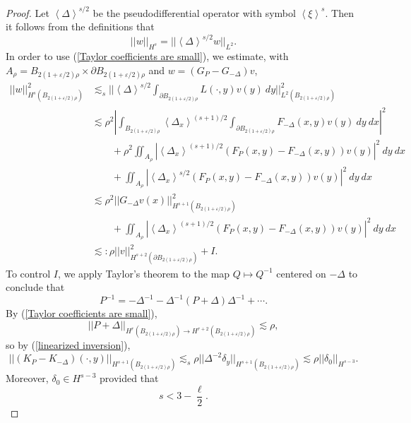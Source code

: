 \documentclass[reqno,12pt,letterpaper]{amsart}
\def\Japan#1{\left \langle #1 \right \rangle}
\theoremstyle{definition}
\numberwithin{equation}{section}
\begin{document}
\begin{proof}
Let $\Japan{\Delta}^{s/2}$ be the pseudodifferential operator with symbol $\Japan{\xi}^s$.
Then it follows from the definitions that
$$||w||_{H^s} = ||\Japan{\Delta}^{s/2} w||_{L^2}.$$
In order to use (\ref{Taylor coefficients are small}), we estimate, with $A_\rho = B_{2(1 + \varepsilon/2)\rho} \times \partial B_{2(1 + \varepsilon/2)\rho}$ and $w = (G_P - G_{-\Delta})v$,
\begin{align*}
||w||_{H^s(B_{2(1 + \varepsilon/2)\rho})}^2 &\lesssim_s ||\Japan{\Delta}^{s/2} \int_{\partial B_{2(1 + \varepsilon/2)\rho}} L(\cdot, y) v(y) ~dy||_{L^2(B_{2(1 + \varepsilon/2)\rho})}^2\\
&\lesssim \rho^2 \left|\int_{B_{2(1 + \varepsilon/2)\rho}} \Japan{\Delta_x}^{(s+1)/2} \int_{\partial B_{2(1 + \varepsilon/2)\rho}} F_{-\Delta}(x, y) v(y) ~dy ~dx\right|^2 \\
&\qquad + \rho^2 \iint_{A_\rho} |\Japan{\Delta_x}^{(s+1)/2} (F_P(x, y) - F_{-\Delta}(x, y)) v(y)|^2 ~dy ~dx \\
&\qquad + \iint_{A_\rho} |\Japan{\Delta_x}^{s/2} (F_P(x, y) - F_{-\Delta}(x, y)) v(y)|^2 ~dy ~dx \\
&\lesssim \rho^2 ||G_{-\Delta}v(x)||_{H^{s+1}(B_{2(1 + \varepsilon/2)\rho})}^2\\
&\qquad + \iint_{A_\rho} |\Japan{\Delta_x}^{(s+1)/2} (F_P(x, y) - F_{-\Delta}(x, y)) v(y)|^2 ~dy ~dx\\
&\lesssim: \rho ||v||_{H^{s + 2}(\partial B_{2(1 + \varepsilon/2)\rho})}^2 + I.
\end{align*}
To control $I$, we apply Taylor's theorem to the map $Q \mapsto Q^{-1}$ centered on $-\Delta$ to conclude that
\begin{equation}\label{linearized inversion}
P^{-1} = -\Delta^{-1} - \Delta^{-1}(P + \Delta)\Delta^{-1} + \cdots.
\end{equation}
By (\ref{Taylor coefficients are small}),
$$||P + \Delta||_{H^r(B_{2(1 + \varepsilon/2)\rho}) \to H^{r+2}(B_{2(1 + \varepsilon/2)\rho})} \lesssim \rho,$$
so by (\ref{linearized inversion}),
$$||(K_P - K_{-\Delta})(\cdot, y)||_{H^{s + 1}(B_{2(1 + \varepsilon/2)\rho})} \lesssim_s \rho ||\Delta^{-2} \delta_y||_{H^{s + 1}(B_{2(1 + \varepsilon/2)\rho})} \lesssim \rho ||\delta_0||_{H^{s-3}}.$$
Moreover, $\delta_0 \in H^{s - 3}$ provided that
\begin{equation}\label{delta regularity}
s < 3 - \frac{\ell}{2}.
\end{equation}


\end{proof}
\end{document}
